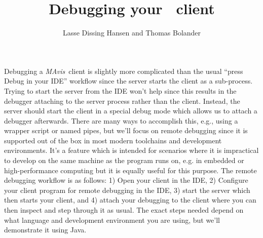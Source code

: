 \documentclass[10pt,a4paper]{article}
\title{Debugging your \mavis\ client}
\author{Lasse Dissing Hansen and Thomas Bolander}
\def\mavis{{\itshape MAvis}}
\begin{document}
\maketitle

Debugging a \mavis\ client is slightly more complicated than the usual ``press Debug in your IDE'' workflow since the server starts the client as a sub-process.
Trying to start the server from the IDE won't help since this results in the debugger attaching to the server process rather than the client.
Instead, the server should start the client in a special debug mode which allows us to attach a debugger afterwards.
There are many ways to accomplish this, e.g., using a wrapper script or named pipes, but we'll focus on remote debugging since it is supported out of the box in most modern toolchains and development environments.
It's a feature which is intended for scenarios where it is impractical to develop on the same machine as the program runs on, e.g. in embedded or high-performance computing but it is equally useful for this purpose.
The remote debugging workflow is as follows: 1) Open your client in the IDE, 2) Configure your client program for remote debugging in the IDE, 3) start the server which then starts your client, and 4) attach your debugging to the client where you can then inspect and step through it as usual.
The exact steps needed depend on what language and development environment you are using, but we'll demonstrate it using Java.
\end{document}
